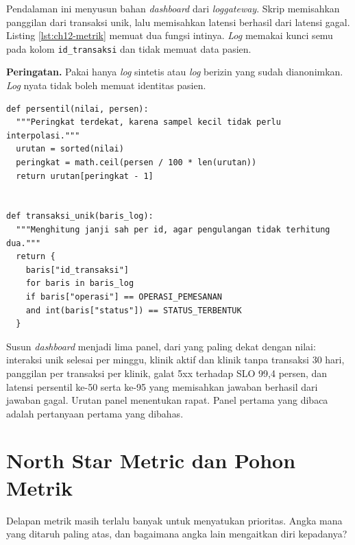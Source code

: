 \begin{pendalaman}[title={Pendalaman Teknis (opsional): Bahan Dashboard Metrik API dari Log Gateway}]
Pendalaman ini menyusun bahan \textit{dashboard} dari \textit{log}\textit{gateway}. Skrip memisahkan panggilan dari transaksi unik, lalu memisahkan latensi berhasil
dari latensi gagal. Listing \ref{lst:ch12-metrik} memuat dua fungsi intinya. \textit{Log} memakai kunci semu pada kolom \texttt{id\_transaksi} dan tidak memuat data pasien.

\textbf{Peringatan.} Pakai hanya \textit{log} sintetis atau \textit{log} berizin yang sudah dianonimkan. \textit{Log} nyata tidak boleh memuat identitas pasien.

\begin{lstlisting}[style=ch12python, caption={Menghitung transaksi unik dan persentil dari \textit{log}, tersedia di \berkas{sources/chapter12/hitung-metrik-gateway.py}}, label={lst:ch12-metrik}]
def persentil(nilai, persen):
  """Peringkat terdekat, karena sampel kecil tidak perlu interpolasi."""
  urutan = sorted(nilai)
  peringkat = math.ceil(persen / 100 * len(urutan))
  return urutan[peringkat - 1]


def transaksi_unik(baris_log):
  """Menghitung janji sah per id, agar pengulangan tidak terhitung dua."""
  return {
    baris["id_transaksi"]
    for baris in baris_log
    if baris["operasi"] == OPERASI_PEMESANAN
    and int(baris["status"]) == STATUS_TERBENTUK
  }
\end{lstlisting}

Susun \textit{dashboard} menjadi lima panel, dari yang paling dekat dengan nilai: interaksi unik selesai per minggu, klinik aktif dan klinik tanpa transaksi
30 hari, panggilan per transaksi per klinik, galat 5xx terhadap SLO 99,4 persen, dan latensi persentil ke-50 serta ke-95 yang memisahkan jawaban berhasil dari
jawaban gagal. Urutan panel menentukan rapat. Panel pertama yang dibaca adalah pertanyaan pertama yang dibahas.
\end{pendalaman}

\section{North Star Metric dan Pohon Metrik}

Delapan metrik masih terlalu banyak untuk menyatukan prioritas. Angka mana yang ditaruh paling atas, dan bagaimana angka lain mengaitkan diri kepadanya?

